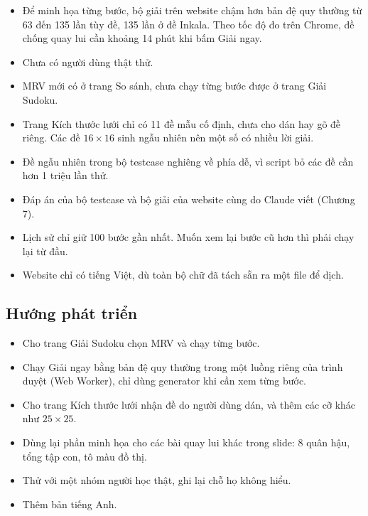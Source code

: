 \begin{itemize}
  \item Để minh họa từng bước, bộ giải trên website chậm hơn bản đệ quy thường từ 63 đến 135 lần tùy đề, 135 lần ở đề Inkala. Theo tốc độ đo trên Chrome, đề chống quay lui cần khoảng 14 phút khi bấm Giải ngay.
  \item Chưa có người dùng thật thử.
  \item MRV mới có ở trang So sánh, chưa chạy từng bước được ở trang Giải Sudoku.
  \item Trang Kích thước lưới chỉ có 11 đề mẫu cố định, chưa cho dán hay gõ đề riêng. Các đề \(16 \times 16\) sinh ngẫu nhiên nên một số có nhiều lời giải.
  \item Đề ngẫu nhiên trong bộ testcase nghiêng về phía dễ, vì script bỏ các đề cần hơn 1 triệu lần thử.
  \item Đáp án của bộ testcase và bộ giải của website cùng do Claude viết (Chương 7).
  \item Lịch sử chỉ giữ 100 bước gần nhất. Muốn xem lại bước cũ hơn thì phải chạy lại từ đầu.
  \item Website chỉ có tiếng Việt, dù toàn bộ chữ đã tách sẵn ra một file để dịch.
\end{itemize}

\subsection*{Hướng phát triển}

\begin{itemize}
  \item Cho trang Giải Sudoku chọn MRV và chạy từng bước.
  \item Chạy Giải ngay bằng bản đệ quy thường trong một luồng riêng của trình duyệt (Web Worker), chỉ dùng generator khi cần xem từng bước.
  \item Cho trang Kích thước lưới nhận đề do người dùng dán, và thêm các cỡ khác như \(25 \times 25\).
  \item Dùng lại phần minh họa cho các bài quay lui khác trong slide: 8 quân hậu, tổng tập con, tô màu đồ thị.
  \item Thử với một nhóm người học thật, ghi lại chỗ họ không hiểu.
  \item Thêm bản tiếng Anh.
\end{itemize}
